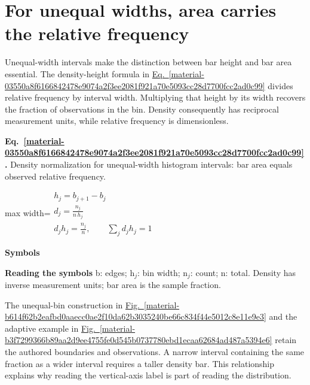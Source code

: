 \documentclass[11pt,a4paper]{article}
\begin{document}
\medskip

\clearpage
\section{For unequal widths, area carries the relative frequency}
Unequal-width intervals make the distinction between bar height and bar area essential. The density-height formula in \hyperref[material-03550a8f6166842478e9074a2f3ee2081f921a70e5093cc28d7700fcc2ad0c99]{Eq.~\ref*{material-03550a8f6166842478e9074a2f3ee2081f921a70e5093cc28d7700fcc2ad0c99}} divides relative frequency by interval width. Multiplying that height by its width recovers the fraction of observations in the bin. Density consequently has reciprocal measurement units, while relative frequency is dimensionless.


\par\medskip
\noindent\begin{minipage}{\linewidth}
\label{material-03550a8f6166842478e9074a2f3ee2081f921a70e5093cc28d7700fcc2ad0c99}
\noindent\textbf{Eq.~\ref*{material-03550a8f6166842478e9074a2f3ee2081f921a70e5093cc28d7700fcc2ad0c99}.} Density normalization for unequal-width histogram intervals: bar area equals observed relative frequency.\par\nopagebreak
\begin{center}\begin{adjustbox}{max width=\linewidth}$\displaystyle \begin{gathered}h_j=b_{j+1}-b_j\\d_j=\frac{n_j}{n\,h_j}\\d_jh_j=\frac{n_j}{n},\qquad\sum_j d_jh_j=1\end{gathered}$\end{adjustbox}\end{center}

\par\noindent\textbf{Symbols}

\par\noindent\textbf{Reading the symbols} b: edges; h\ensuremath{{}_j}: bin width; n\ensuremath{{}_j}: count; n: total. Density has inverse measurement units; bar area is the sample fraction.

\end{minipage}\par
\medskip

The unequal-bin construction in \hyperref[material-b614f62b2eafbd0aaecc0ae2f10da62b3035240be66c834f44e5012c8e11e9e3]{Fig.~\ref*{material-b614f62b2eafbd0aaecc0ae2f10da62b3035240be66c834f44e5012c8e11e9e3}} and the adaptive example in \hyperref[material-b3f7299366b89aa2d9ee4755fe0d545b0737780ebd1ecaa62684ad487a5394e6]{Fig.~\ref*{material-b3f7299366b89aa2d9ee4755fe0d545b0737780ebd1ecaa62684ad487a5394e6}} retain the authored boundaries and observations. A narrow interval containing the same fraction as a wider interval requires a taller density bar. This relationship explains why reading the vertical-axis label is part of reading the distribution.
\end{document}
